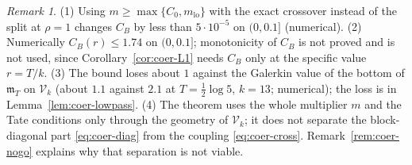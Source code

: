 \documentclass[11pt]{amsart}
\theoremstyle{definition}
\theoremstyle{remark}
\newtheorem{remark}[theorem]{Remark}
\newcommand{\mT}{\mathfrak m_T}
\begin{document}
\begin{remark}\label{rem:coer-B}
(1) Using $m\ge\max\{C_0,m_{\mathrm{lo}}\}$ with the exact crossover instead of the split at $\rho=1$ changes $C_B$ by less
than $5\cdot10^{-5}$ on $(0,0.1]$ (numerical). (2) Numerically $C_B(r)\le1.74$ on $(0,0.1]$; monotonicity of $C_B$ is not
proved and is not used, since Corollary~\ref{cor:coer-L1} needs $C_B$ only at the specific value $r=T/k$. (3) The bound
loses about $1$ against the Galerkin value of the bottom of $\mT$ on $\mathcal V_k$ (about $1.1$ against $2.1$ at
$T=\frac12\log5$, $k=13$; numerical); the loss is in Lemma~\ref{lem:coer-lowpass}. (4) The theorem uses the whole
multiplier $m$ and the Tate conditions only through the geometry of $\mathcal V_k$; it does not separate the block-diagonal
part \eqref{eq:coer-diag} from the coupling \eqref{eq:coer-cross}. Remark~\ref{rem:coer-nogo} explains why that separation
is not viable.
\end{remark}
\end{document}
